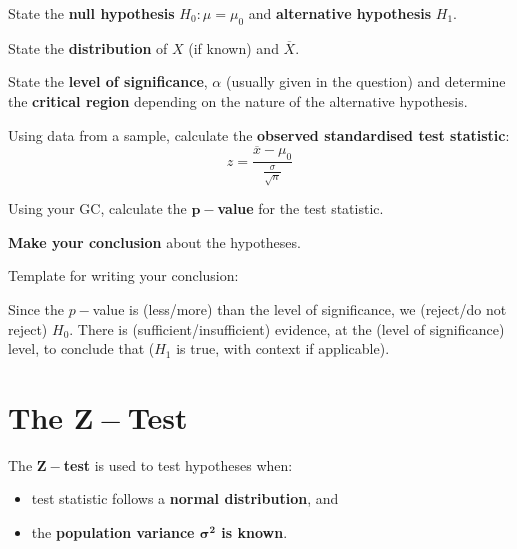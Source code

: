 \documentclass[11pt,a4paper]{book}
\begin{document}
\begin{tcolorbox}[colback=blue!5, colframe=black, boxrule=.4pt, sharpish corners]

\begin{steps}[leftmargin=1.5cm]

\item  State the \textbf{null hypothesis} $H_{0}:\mu=\mu_{0}$ and
\textbf{alternative hypothesis} $H_{1}$.

\item  State the \textbf{distribution} of $X$ (if known) and $\overline{X}$.

\item  State the \textbf{level of significance}, $\alpha$ (usually
given in the question) and determine the \textbf{critical region}
depending on the nature of the alternative hypothesis.

\item  Using data from a sample, calculate the \textbf{observed standardised
test statistic}: 
\[
z=\frac{\overline{x}-\mu_{0}}{\frac{\sigma}{\sqrt{n}}}
\]

\item  Using your GC, calculate the \textbf{$\boldsymbol{p-}$value}
for the test statistic.

\item  \textbf{Make your conclusion }about the hypotheses.

Template for writing your conclusion:
\begin{tcolorbox}[colback=blue!5, colframe=black,boxrule=.4pt, sharpish corners]

Since the $p-$value is (less/more) than the level of significance,
we (reject/do not reject) $H_{0}$. There is (sufficient/insufficient)
evidence, at the (level of significance) level, to conclude that ($H_{1}$
is true, with context if applicable).
\end{tcolorbox}

\end{steps}
\end{tcolorbox}

\newpage

\section{The $\boldsymbol{Z-}$Test}

\begin{tcolorbox}[colback=blue!5, colframe=black, boxrule=.4pt, sharpish corners]

The $\boldsymbol{Z-}$\textbf{test }is used to test hypotheses when:

\begin{itemize}

\item  test statistic follows a \textbf{normal distribution}, and

\item  the \textbf{population variance $\boldsymbol{\sigma^{2}}$
is known}.

\end{itemize}
\end{tcolorbox}
\end{document}
